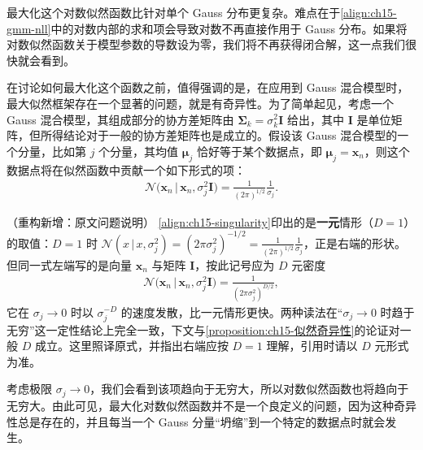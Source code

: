 \documentclass[../../main.tex]{subfiles}
\begin{document}
最大化这个对数似然函数比针对单个 Gauss 分布更复杂。难点在于\eqref{align:ch15-gmm-nll}中的对数内部的求和项会导致对数不再直接作用于 Gauss 分布。如果将对数似然函数关于模型参数的导数设为零，我们将不再获得闭合解，这一点我们很快就会看到。

在讨论如何最大化这个函数之前，值得强调的是，在应用到 Gauss 混合模型时，最大似然框架存在一个显著的问题，就是有奇异性。为了简单起见，考虑一个 Gauss 混合模型，其组成部分的协方差矩阵由 $\bm{\Sigma}_k=\sigma_k^2\bm{I}$ 给出，其中 $\bm{I}$ 是单位矩阵，但所得结论对于一般的协方差矩阵也是成立的。假设该 Gauss 混合模型的一个分量，比如第 $j$ 个分量，其均值 $\bm{\mu}_j$ 恰好等于某个数据点，即 $\bm{\mu}_j=\bm{x}_n$，则这个数据点将在似然函数中贡献一个如下形式的项：
\begin{align}
\mathcal{N}\big(\bm{x}_n\,|\,\bm{x}_n,\sigma_j^2\bm{I}\big)=\frac{1}{(2\pi)^{1/2}}\frac{1}{\sigma_j}.
\label{align:ch15-singularity}
\end{align}

\begin{remark}（重构新增：原文问题说明）
\eqref{align:ch15-singularity}印出的是\textbf{一元}情形（$D=1$）的取值：$D=1$ 时 $\mathcal{N}(x\,|\,x,\sigma_j^2)=(2\pi\sigma_j^2)^{-1/2}=\frac{1}{(2\pi)^{1/2}}\frac{1}{\sigma_j}$，正是右端的形状。但同一式左端写的是向量 $\bm{x}_n$ 与矩阵 $\bm{I}$，按此记号应为 $D$ 元密度
\begin{align*}
\mathcal{N}\big(\bm{x}_n\,|\,\bm{x}_n,\sigma_j^2\bm{I}\big)=\frac{1}{(2\pi\sigma_j^2)^{D/2}},
\end{align*}
它在 $\sigma_j\to0$ 时以 $\sigma_j^{-D}$ 的速度发散，比一元情形更快。两种读法在“$\sigma_j\to0$ 时趋于无穷”这一定性结论上完全一致，下文与\cref{proposition:ch15-似然奇异性}的论证对一般 $D$ 成立。这里照译原式，并指出右端应按 $D=1$ 理解，引用时请以 $D$ 元形式为准。
\end{remark}

考虑极限 $\sigma_j\rightarrow0$，我们会看到该项趋向于无穷大，所以对数似然函数也将趋向于无穷大。由此可见，最大化对数似然函数并不是一个良定义的问题，因为这种奇异性总是存在的，并且每当一个 Gauss 分量“坍缩”到一个特定的数据点时就会发生。
\end{document}
